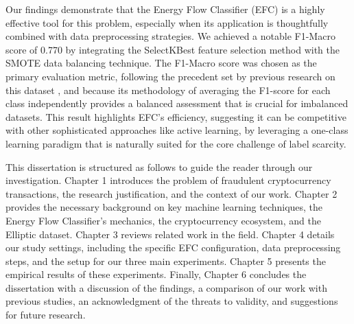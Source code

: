 Our findings demonstrate that the Energy Flow Classifier (EFC) is a highly effective tool for this problem, especially when
its application is thoughtfully combined with data preprocessing strategies. We achieved a notable F1-Macro score of 0.770
by integrating the SelectKBest feature selection method with the SMOTE data balancing technique. The F1-Macro score was
chosen as the primary evaluation metric, following the precedent set by previous research on this dataset , and because
its methodology of averaging the F1-score for each class independently provides a balanced assessment that is crucial for
imbalanced datasets. This result highlights EFC's efficiency, suggesting it can be competitive with other sophisticated
approaches like active learning, by leveraging a one-class learning paradigm that is naturally suited for the core challenge
of label scarcity.

This dissertation is structured as follows to guide the reader through our investigation. Chapter 1 introduces the problem
of fraudulent cryptocurrency transactions, the research justification, and the context of our work. Chapter 2 provides the
necessary background on key machine learning techniques, the Energy Flow Classifier's mechanics, the cryptocurrency ecosystem,
and the Elliptic dataset. Chapter 3 reviews related work in the field. Chapter 4 details our study settings, including the
specific EFC configuration, data preprocessing steps, and the setup for our three main experiments. Chapter 5 presents the
empirical results of these experiments. Finally, Chapter 6 concludes the dissertation with a discussion of the findings,
a comparison of our work with previous studies, an acknowledgment of the threats to validity, and suggestions for future research.


